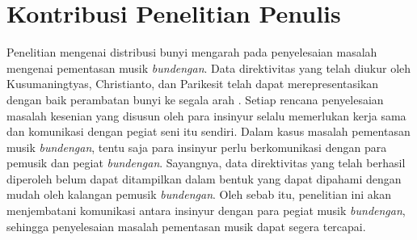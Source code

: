 \section{Kontribusi Penelitian Penulis}
Penelitian mengenai distribusi bunyi \bundengan mengarah pada penyelesaian masalah mengenai pementasan musik \textit{bundengan}. Data direktivitas \bundengan yang telah diukur oleh Kusumaningtyas, Christianto, dan Parikesit telah dapat merepresentasikan dengan baik perambatan bunyi \bundengan ke segala arah \cite{prosidingDirektivitas}. Setiap rencana penyelesaian masalah kesenian yang disusun oleh para insinyur selalu memerlukan kerja sama dan komunikasi dengan pegiat seni itu sendiri. Dalam kasus masalah pementasan musik \textit{bundengan}, tentu saja para insinyur perlu berkomunikasi dengan para pemusik dan pegiat \textit{bundengan}. Sayangnya, data direktivitas yang telah berhasil diperoleh belum dapat ditampilkan dalam bentuk yang dapat dipahami dengan mudah oleh kalangan pemusik \textit{bundengan}. Oleh sebab itu, penelitian ini akan menjembatani komunikasi antara insinyur dengan para pegiat musik \textit{bundengan}, sehingga penyelesaian masalah pementasan musik \bundengan dapat segera tercapai. \par 